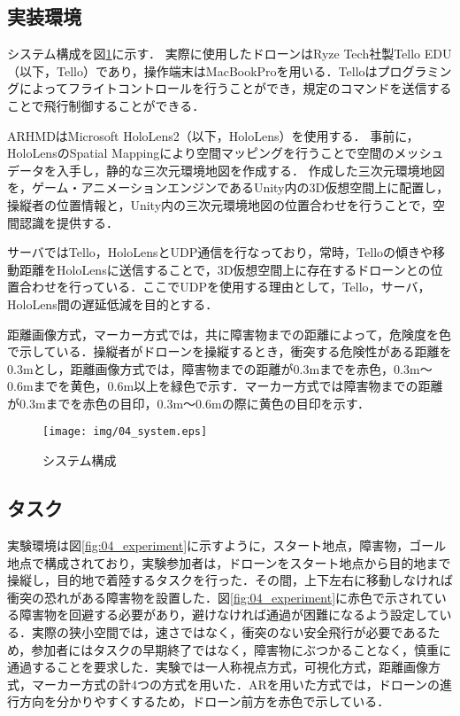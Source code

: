 \documentclass[submit]{ipsj}
\begin{document}
\subsection{実装環境}
システム構成を図\ref{fig:04_system}に示す．
実際に使用したドローンはRyze Tech社製Tello EDU（以下，Tello）であり，操作端末はMacBookProを用いる．Telloはプログラミングによってフライトコントロールを行うことができ，規定のコマンドを送信することで飛行制御することができる．
\par
ARHMDはMicrosoft HoloLens2（以下，HoloLens）を使用する．
事前に，HoloLensのSpatial Mappingにより空間マッピングを行うことで空間のメッシュデータを入手し，静的な三次元環境地図を作成する．
作成した三次元環境地図を，ゲーム・アニメーションエンジンであるUnity内の3D仮想空間上に配置し，操縦者の位置情報と，Unity内の三次元環境地図の位置合わせを行うことで，空間認識を提供する．
\par
サーバではTello，HoloLensとUDP通信を行なっており，常時，Telloの傾きや移動距離をHoloLensに送信することで，3D仮想空間上に存在するドローンとの位置合わせを行っている．ここでUDPを使用する理由として，Tello，サーバ，HoloLens間の遅延低減を目的とする．
\par
距離画像方式，マーカー方式では，共に障害物までの距離によって，危険度を色で示している．操縦者がドローンを操縦するとき，衝突する危険性がある距離を0.3mとし\cite{Yamada}，距離画像方式では，障害物までの距離が0.3mまでを赤色，0.3m〜0.6mまでを黄色，0.6m以上を緑色で示す．マーカー方式では障害物までの距離が0.3mまでを赤色の目印，0.3m〜0.6mの際に黄色の目印を示す．


\begin{figure}[tb]
\centering
\texttt{[image: img/04\_system.eps]}
\caption{システム構成}
\label{fig:04_system}
\end{figure}


\subsection{タスク}
実験環境は図\ref{fig:04_experiment}に示すように，スタート地点，障害物，ゴール地点で構成されており，実験参加者は，ドローンをスタート地点から目的地まで操縦し，目的地で着陸するタスクを行った．その間，上下左右に移動しなければ衝突の恐れがある障害物を設置した．図\ref{fig:04_experiment}に赤色で示されている障害物を回避する必要があり，避けなければ通過が困難になるよう設定している．実際の狭小空間では，速さではなく，衝突のない安全飛行が必要であるため，参加者にはタスクの早期終了ではなく，障害物にぶつかることなく，慎重に通過することを要求した．実験では一人称視点方式，可視化方式，距離画像方式，マーカー方式の計4つの方式を用いた．ARを用いた方式では，ドローンの進行方向を分かりやすくするため，ドローン前方を赤色で示している．
\end{document}
